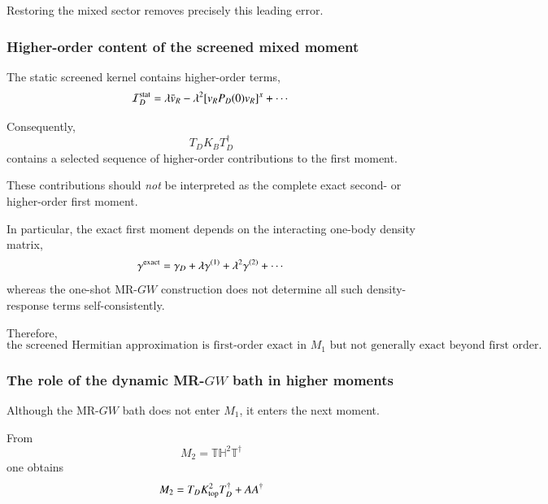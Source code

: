 \documentclass[aip,jcp,reprint,noshowkeys,superscriptaddress]{revtex4-1}
\begin{document}
Restoring the mixed sector removes precisely this leading error.


\subsubsection{Higher-order content of the screened mixed moment}

The static screened kernel contains higher-order terms,
\begin{equation}
  \mathcal I_D^{\rm stat}
  =
  \lambda\bar v_R
  -
  \lambda^2
  [v_RP_D(0)v_R]^x
  +
  \cdots
\end{equation}

Consequently,
\begin{equation}
  T_DK_BT_D^\dagger
\end{equation}
contains a selected sequence of higher-order contributions to the
first moment.

These contributions should \emph{not} be interpreted as the complete
exact second- or higher-order first moment.

In particular, the exact first moment depends on the interacting
one-body density matrix,
\begin{equation}
  \gamma^{\rm exact}
  =
  \gamma_D
  +
  \lambda\gamma^{(1)}
  +
  \lambda^2\gamma^{(2)}
  +
  \cdots
\end{equation}
whereas the one-shot MR-$GW$ construction does not determine all such
density-response terms self-consistently.

Therefore,
\begin{equation}
  \text{the screened Hermitian approximation is first-order exact in
  }M_1
  \text{ but not generally exact beyond first order.}
  \label{eq:M1-order-statement}
\end{equation}


\subsubsection{The role of the dynamic MR-$GW$ bath in higher moments}

Although the MR-$GW$ bath does not enter $M_1$, it enters the next
moment.

From
\begin{equation}
  M_2
  =
  \mathbb T
  \mathbb H^2
  \mathbb T^\dagger
\end{equation}
one obtains
\begin{equation}
  M_2
  =
  T_DK_{\rm top}^2T_D^\dagger
  +
  AA^\dagger
  \label{eq:M2-preview}
\end{equation}
\end{document}
